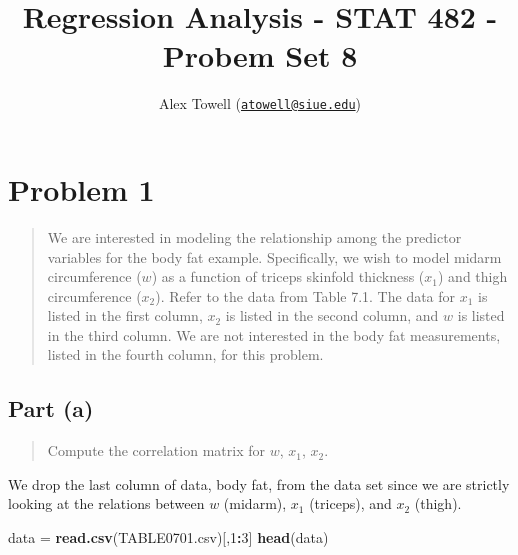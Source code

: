 \documentclass[
]{article}
\title{Regression Analysis - STAT 482 - Probem Set 8}
\author{Alex Towell
(\href{mailto:atowell@siue.edu}{\nolinkurl{atowell@siue.edu}})}
\date{}
\newenvironment{Shaded}{\begin{snugshade}}{\end{snugshade}}
\newcommand{\DecValTok}[1]{\textcolor[rgb]{0.00,0.00,0.81}{#1}}
\newcommand{\FunctionTok}[1]{\textcolor[rgb]{0.13,0.29,0.53}{\textbf{#1}}}
\newcommand{\NormalTok}[1]{#1}
\newcommand{\OtherTok}[1]{\textcolor[rgb]{0.56,0.35,0.01}{#1}}
\newcommand{\SpecialCharTok}[1]{\textcolor[rgb]{0.81,0.36,0.00}{\textbf{#1}}}
\newcommand{\StringTok}[1]{\textcolor[rgb]{0.31,0.60,0.02}{#1}}
\begin{document}
\maketitle

\newcommand{\sos}[1]{\mathrm{SS_{#1}}}
\newcommand{\ms}[1]{\mathrm{MS_{#1}}}
\newcommand{\sd}{\operatorname{sd}}
\newcommand{\var}{\operatorname{var}}
\newcommand{\expect}{\operatorname{E}}
\newcommand{\corr}{\operatorname{cor}}
\newcommand{\cov}{\operatorname{cov}}
\newcommand{\se}{\operatorname{se}}
\newcommand{\eval}[2]{\left. #1 \right\vert_{#2}}
\newcommand{\degf}[1]{\mathrm{df_{#1}}}
\newcommand{\entropy}{\operatorname{H}}

\hypertarget{problem-1}{%
\section{Problem 1}\label{problem-1}}

\begin{quote}
We are interested in modeling the relationship among the predictor
variables for the body fat example. Specifically, we wish to model
midarm circumference (\(w\)) as a function of triceps skinfold thickness
(\(x_1\)) and thigh circumference (\(x_2\)). Refer to the data from
Table 7.1. The data for \(x_1\) is listed in the first column, \(x_2\)
is listed in the second column, and \(w\) is listed in the third column.
We are not interested in the body fat measurements, listed in the fourth
column, for this problem.
\end{quote}

\hypertarget{part-a}{%
\subsection{Part (a)}\label{part-a}}

\begin{quote}
Compute the correlation matrix for \(w\), \(x_1\), \(x_2\).
\end{quote}

We drop the last column of data, body fat, from the data set since we
are strictly looking at the relations between \(w\) (midarm), \(x_1\)
(triceps), and \(x_2\) (thigh).

\begin{Shaded}
\begin{Highlighting}[]
\NormalTok{data }\OtherTok{=} \FunctionTok{read.csv}\NormalTok{(}\StringTok{\textquotesingle{}TABLE0701.csv\textquotesingle{}}\NormalTok{)[,}\DecValTok{1}\SpecialCharTok{:}\DecValTok{3}\NormalTok{]}
\FunctionTok{head}\NormalTok{(data)}
\end{Highlighting}
\end{Shaded}
\end{document}
